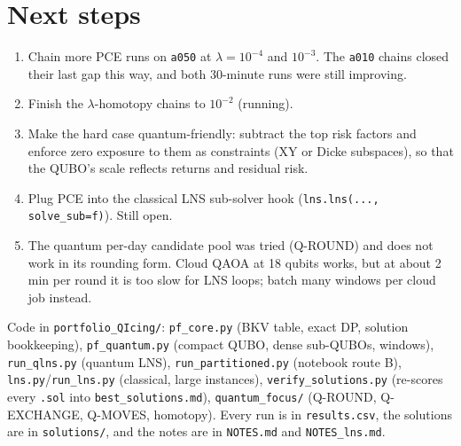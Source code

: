 \documentclass[11pt]{article}
\begin{document}
\section{Next steps}
\begin{enumerate}
\item Chain more PCE runs on \texttt{a050} at $\lambda=10^{-4}$ and $10^{-3}$. The \texttt{a010} chains
  closed their last gap this way, and both 30-minute runs were still improving.
\item Finish the $\lambda$-homotopy chains to $10^{-2}$ (running).
\item Make the hard case quantum-friendly: subtract the top risk factors and enforce zero exposure to them
  as constraints (XY or Dicke subspaces), so that the QUBO's scale reflects returns and residual risk.
\item Plug PCE into the classical LNS sub-solver hook (\texttt{lns.lns(..., solve\_sub=f)}). Still open.
\item The quantum per-day candidate pool was tried (Q-ROUND) and does not work in its rounding form.
  Cloud QAOA at 18 qubits works, but at about 2\,min per round it is too slow for LNS loops; batch
  many windows per cloud job instead.
\end{enumerate}

\vfill\noindent\footnotesize
Code in \texttt{portfolio\_QIcing/}: \texttt{pf\_core.py} (BKV table, exact DP, solution bookkeeping),
\texttt{pf\_quantum.py} (compact QUBO, dense sub-QUBOs, windows), \texttt{run\_qlns.py} (quantum LNS),
\texttt{run\_partitioned.py} (notebook route B), \texttt{lns.py}/\texttt{run\_lns.py} (classical, large instances),
\texttt{verify\_solutions.py} (re-scores every \texttt{.sol} into \texttt{best\_solutions.md}), \texttt{quantum\_focus/} (Q-ROUND, Q-EXCHANGE, Q-MOVES, homotopy). Every run is
in \texttt{results.csv}, the solutions are in \texttt{solutions/}, and the notes are in \texttt{NOTES.md} and \texttt{NOTES\_lns.md}.
\end{document}
